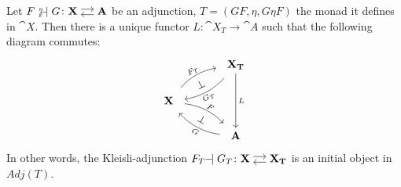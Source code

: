 \begin{theorem}
    Let $F {\ }_{\eps}^{\text{\tiny{$\eta$}}}\!\!\!\!\adj G \colon \adjar{X}{A}$ be an adjunction,
    $T = (GF,\eta,G\eta F)$ the monad it defines in $\cat{X}$. Then there is a unique functor
    $L \colon \cat{X_T} \to \cat{A}$ such that the following diagram commutes:
    \[
        \begin{tikzcd}[column sep = 4em]
            & \cat{X_T} \ar[ld,bend left=20,"G_T"',shorten=2mm,sloped] \ar[dd,"L"] \\
            \cat{X} \ar[ru,bend left = 20,"F_T",shorten=2mm,sloped,pos=0.48] \ar[rd,bend left = 20,"F",shorten=2mm,sloped,pos=0.55]
            \ar[ru,"\bot",phantom,description,sloped] \ar[rd,"\bot",phantom,description,sloped]
            & \\
            & \cat{A} \ar[lu,bend left = 20,"G"',shorten=2mm,sloped]
        \end{tikzcd}
    \]
    In other words, the Kleisli-adjunction $F_T \! \! \adj G_T \colon \adjar{X}{X_T}$ is an initial object in $Adj(T)$.
\end{theorem}
